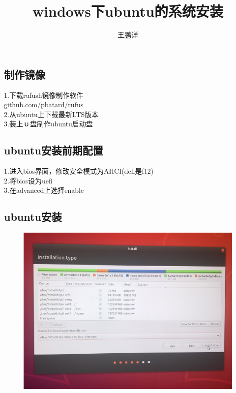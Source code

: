 \documentclass[12pt,a4paper]{article}
\title{windows下ubuntu的系统安装}
\author{王鹏详}
\date{\chntoday}
\begin{document}
	\maketitle
	\newpage
	\subsection{制作镜像}
	1.下载rufush镜像制作软件\\
	github.com/pbatard/rufus\\
	2.从ubuntu上下载最新LTS版本\\
	3.装上ｕ盘制作ubuntu启动盘
	\subsection{ubuntu安装前期配置}
	1.进入bios界面，修改安全模式为AHCI(dell是f12)\\
	2.将bios设为uefi\\
	3.在advanced上选择enable\\
	\subsection{ubuntu安装}
	\begin{figure}[H]
		\centering
		\includegraphics[width=0.7\linewidth]{figures/IMG_2810}
		\caption{}
		\label{fig:img2810}
	\end{figure}
	
\end{document}

